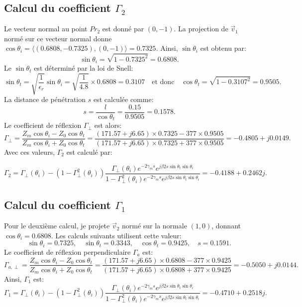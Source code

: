 \subsection*{Calcul du coefficient $\Gamma_2$}
Le vecteur normal au point $Pr_2$ est donné par $(0, -1)$. La projection de $\vec{v}_1$ normé sur ce vecteur normal donne $\cos \theta_i = \langle (0.6808, -0.7325), (0, -1) \rangle = 0.7325$. Ainsi, $\sin \theta_i$ est obtenu par:
\[
\sin \theta_i = \sqrt{1 - 0.7325^2} = 0.6808.
\]
Le $\sin \theta_t$ est déterminé par la loi de Snell:
\[
\sin \theta_t = \sqrt{\frac{1}{\epsilon_r}} \sin \theta_i = \sqrt{\frac{1}{4.8}} \times 0.6808 = 0.3107 \quad \text{et donc} \quad \cos \theta_t = \sqrt{1 - 0.3107^2} = 0.9505.
\]
La distance de pénétration $s$ est calculée comme:
\[
s = \frac{l}{\cos \theta_t} = \frac{0.15}{0.9505} = 0.1578.
\]
Le coefficient de réflexion $\Gamma_{\perp}$ est alors:
\[
\Gamma_{\perp} = \frac{Z_m \cos \theta_i - Z_0 \cos \theta_t}{Z_m \cos \theta_i + Z_0 \cos \theta_t} = \frac{(171.57 + j6.65) \times 0.7325 - 377 \times 0.9505}{(171.57 + j6.65) \times 0.7325 + 377 \times 0.9505} = -0.4805 + j0.0149.
\]
Avec ces valeurs, $\Gamma_2$ est calculé par:

\[
\Gamma_2 =  \Gamma_{\perp}(\theta_i) -(1 - \Gamma^2_{\perp}(\theta_i)) \frac{ \Gamma_{\perp}(\theta_i) e^{-2\gamma_m s} e^{j\beta2s \sin \theta_t \sin \theta_i}}{1 - \Gamma^2_{\perp}(\theta_i) e^{-2\gamma_m s} e^{j\beta2s \sin \theta_t \sin \theta_i}} = -0.4188 + 0.2462j.
\]

\subsection*{Calcul du coefficient $\Gamma_1$}
Pour le deuxième calcul, je projete $\vec{v}_2$ normé sur la normale $(1, 0)$, donnant $\cos \theta_i = 0.6808$. Les calculs suivants utilisent cette valeur:
\[
\sin \theta_i = 0.7325, \quad \sin \theta_t = 0.3343, \quad \cos \theta_t = 0.9425, \quad s = 0.1591.
\]
Le coefficient de réflexion perpendiculaire $\Gamma_a$ est:
\[
\Gamma_{a,\perp} = \frac{Z_m \cos \theta_i - Z_0 \cos \theta_t}{Z_m \cos \theta_i + Z_0 \cos \theta_t} = \frac{(171.57 + j6.65) \times 0.6808 - 377 \times 0.9425}{(171.57 + j6.65) \times 0.6808 + 377 \times 0.9425} = -0.5050 + j0.0144.
\]
Ainsi, $\Gamma_1$ est:
\[
\Gamma_1 = \Gamma_{\perp}(\theta_i) -(1 - \Gamma^2_{\perp}(\theta_i)) \frac{ \Gamma_{\perp}(\theta_i) e^{-2\gamma_m s} e^{j\beta2s \sin \theta_t \sin \theta_i}}{1 - \Gamma^2_{\perp}(\theta_i) e^{-2\gamma_m s} e^{j\beta2s \sin \theta_t \sin \theta_i}}= -0.4710 + 0.2518j.
\]

